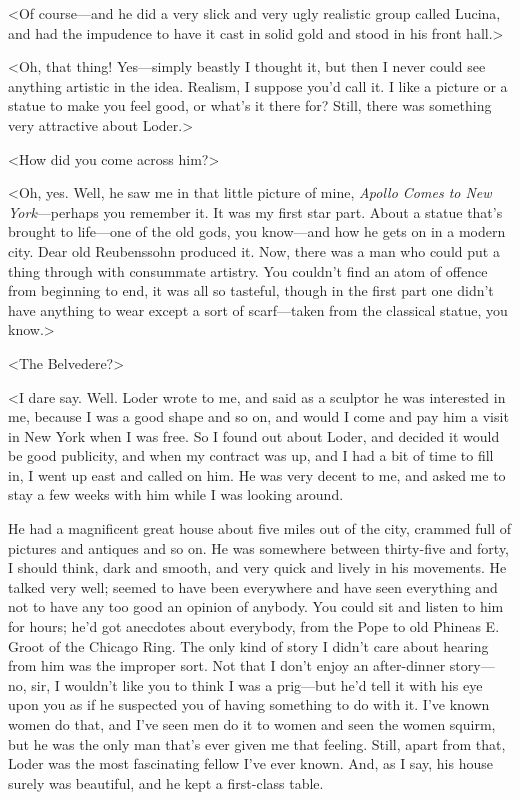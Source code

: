 <Of course—and he did a very slick and very ugly realistic group called Lucina, and had the impudence to have it cast in solid gold and stood in his front hall.>

<Oh, that thing! Yes—simply beastly I thought it, but then I never could see anything artistic in the idea. Realism, I suppose you'd call it. I like a picture or a statue to make you feel good, or what's it there for? Still, there was something very attractive about Loder.>

<How did you come across him?>

<Oh, yes. Well, he saw me in that little picture of mine, \textit{Apollo Comes to New York}—perhaps you remember it. It was my first star part. About a statue that's brought to life—one of the old gods, you know—and how he gets on in a modern city. Dear old Reubenssohn produced it. Now, there was a man who could put a thing through with consummate artistry. You couldn't find an atom of offence from beginning to end, it was all so tasteful, though in the first part one didn't have anything to wear except a sort of scarf—taken from the classical statue, you know.>

<The Belvedere?>

<I dare say. Well. Loder wrote to me, and said as a sculptor he was interested in me, because I was a good shape and so on, and would I come and pay him a visit in New York when I was free. So I found out about Loder, and decided it would be good publicity, and when my contract was up, and I had a bit of time to fill in, I went up east and called on him. He was very decent to me, and asked me to stay a few weeks with him while I was looking around.

He had a magnificent great house about five miles out of the city, crammed full of pictures and antiques and so on. He was somewhere between thirty-five and forty, I should think, dark and smooth, and very quick and lively in his movements. He talked very well; seemed to have been everywhere and have seen everything and not to have any too good an opinion of anybody. You could sit and listen to him for hours; he'd got anecdotes about everybody, from the Pope to old Phineas E\@. Groot of the Chicago Ring. The only kind of story I didn't care about hearing from him was the improper sort. Not that I don't enjoy an after-dinner story—no, sir, I wouldn't like you to think I was a prig—but he'd tell it with his eye upon you as if he suspected you of having something to do with it. I've known women do that, and I've seen men do it to women and seen the women squirm, but he was the only man that's ever given me that feeling. Still, apart from that, Loder was the most fascinating fellow I've ever known. And, as I say, his house surely was beautiful, and he kept a first-class table.

